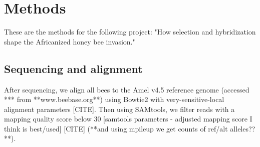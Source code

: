 \documentclass[12pt]{report}
\begin{document}
\section{Methods}
These are the methods for the following project: "How selection and hybridization shape the Africanized honey bee invasion."\par

\subsection{Sequencing and alignment}
After sequencing, we align all bees to the Amel v4.5 reference genome (accessed *** from **www.beebase.org**) using Bowtie2 with very-sensitive-local alignment parameters [CITE]. Then using SAMtools, we filter reads with a mapping quality score below 30 [samtools parameters - adjusted mapping score I think is best/used] [CITE] (**and using mpileup we get counts of ref/alt alleles??**).
\end{document}
